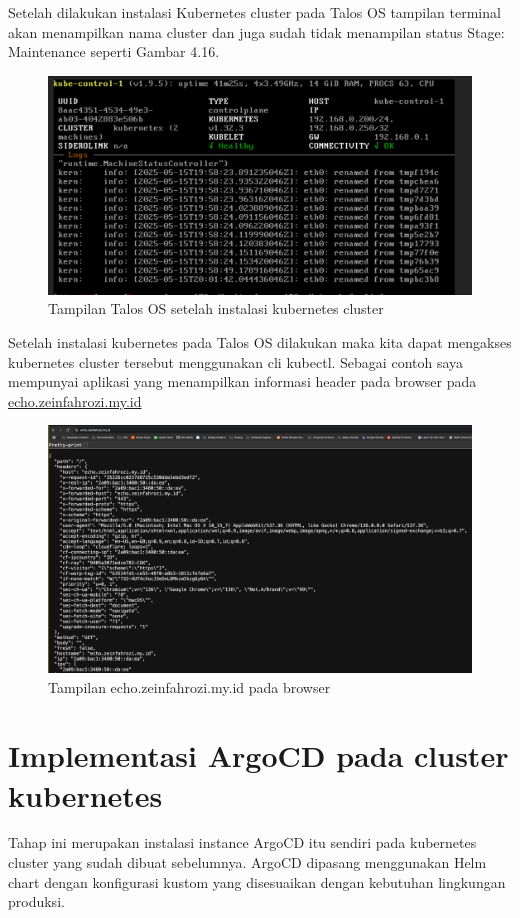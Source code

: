 \newpage
Setelah dilakukan instalasi Kubernetes cluster pada Talos OS tampilan terminal akan menampilkan nama cluster
dan juga sudah tidak menampilan status Stage: Maintenance seperti Gambar 4.16.
\begin{figure}[!ht]
  \centering
  \includegraphics[width=1\textwidth]{figures/talos-install-11.jpg}
  \caption{Tampilan Talos OS setelah instalasi kubernetes cluster}
\end{figure}
\newpage
Setelah instalasi kubernetes pada Talos OS dilakukan maka kita dapat mengakses kubernetes cluster tersebut menggunakan cli kubectl.
Sebagai contoh saya mempunyai aplikasi yang menampilkan informasi header pada browser pada \url{echo.zeinfahrozi.my.id}
\begin{figure}[!ht]
  \centering
  \includegraphics[width=1\textwidth]{figures/echo-web.jpg}
  \caption{Tampilan echo.zeinfahrozi.my.id pada browser}
\end{figure}
\section{Implementasi ArgoCD pada cluster kubernetes}
Tahap ini merupakan instalasi instance ArgoCD itu sendiri pada kubernetes cluster yang sudah dibuat sebelumnya. ArgoCD dipasang menggunakan Helm chart dengan konfigurasi kustom yang disesuaikan dengan kebutuhan lingkungan produksi.

